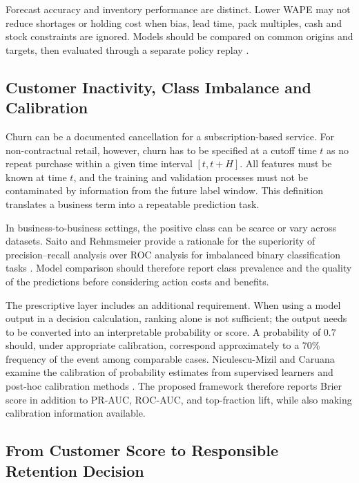 \documentclass[a4paper,11pt,oneside]{book}
\theoremstyle{plain}
\theoremstyle{definition}
\theoremstyle{remark}
\begin{document}
Forecast accuracy and inventory performance are distinct. Lower WAPE may
not reduce shortages or holding cost when bias, lead time, pack multiples,
cash and stock constraints are ignored. Models should be compared on common
origins and targets, then evaluated through a separate policy replay
\cite{syntetos2010stock}.

\subsection{Customer Inactivity, Class Imbalance and Calibration}

Churn can be a documented cancellation for a subscription-based service. For non-contractual retail, however, churn has to be specified at a cutoff time $t$ as no repeat purchase within a given time interval $[t,t+H]$. All features must be known at time $t$, and the training and validation processes must not be contaminated by information from the future label window. This definition translates a business term into a repeatable prediction task.

In business-to-business settings, the positive class can be scarce or vary across datasets. Saito and Rehmsmeier provide a rationale for the superiority of precision--recall analysis over ROC analysis for imbalanced binary classification tasks \cite{saito2015pr}. Model comparison should therefore report class prevalence and the quality of the predictions before considering action costs and benefits.

The prescriptive layer includes an additional requirement. When using a model output in a decision calculation, ranking alone is not sufficient; the output needs to be converted into an interpretable probability or score. A probability of $0.7$ should, under appropriate calibration, correspond approximately to a 70\% frequency of the event among comparable cases. Niculescu-Mizil and Caruana examine the calibration of probability estimates from supervised learners and post-hoc calibration methods \cite{niculescu2005calibration}. The proposed framework therefore reports Brier score in addition to PR-AUC, ROC-AUC, and top-fraction lift, while also making calibration information available.




\subsection{From Customer Score to Responsible Retention Decision}
\end{document}
